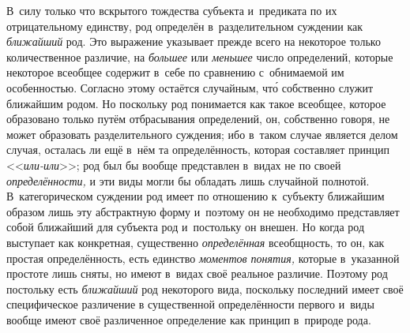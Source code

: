 В~силу только что вскрытого тождества субъекта и~предиката по
их отрицательному единству, род определён в~разделительном суждении как
{\em ближайший} род. Это
выражение указывает прежде всего на некоторое только количественное
различие, на {\em большее} или {\em меньшее}
число определений, которые некоторое всеобщее содержит в~себе
по сравнению с~обнимаемой им особенностью. Согласно этому остаётся
случайным, чт\'{о} собственно служит ближайшим родом. Но поскольку род
понимается как такое всеобщее, которое образовано только путём отбрасывания
определений, он, собственно говоря, не может образовать разделительного
суждения; ибо в~таком случае является делом случая, осталась ли ещё в~нём
та определённость, которая составляет принцип <<{\em или-или}>>; род был
бы вообще представлен в~видах не по своей {\em определённости,} и
эти виды могли бы обладать лишь случайной полнотой. В~категорическом
суждении род имеет по отношению к~субъекту ближайшим образом лишь эту
абстрактную форму и~поэтому он не необходимо представляет собой ближайший
для субъекта род и~постольку он внешен. Но когда род выступает как
конкретная, существенно {\em определённая}
всеобщность, то он, как простая определённость, есть единство
{\em моментов понятия,}
которые в~указанной простоте лишь сняты, но
имеют в~видах своё реальное различие. Поэтому род постольку есть
{\em ближайший} род
некоторого вида, поскольку последний имеет своё специфическое различение в
существенной определённости первого и~виды вообще имеют своё различенное
определение как принцип в~природе рода.

